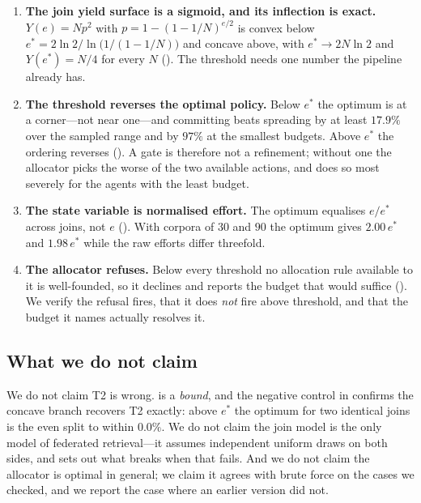 \documentclass[11pt,twocolumn,a4paper]{article}
\theoremstyle{thmstyle}
\theoremstyle{definition}
\theoremstyle{remark}
\newcommand{\eff}{e}
\newcommand{\estar}{e^{*}}
\newcommand{\yield}{Y}
\begin{document}
\begin{enumerate}[leftmargin=1.4em,itemsep=3pt]
\item \textbf{The join yield surface is a sigmoid, and its inflection is
exact.} $\yield(\eff)=Np^{2}$ with $p=1-(1-1/N)^{\eff/2}$ is convex below
$\estar=2\ln2/\ln\!\big(1/(1-1/N)\big)$ and concave above, with
$\estar\to 2N\ln2$ and $\yield(\estar)=N/4$ for every $N$
(). The threshold needs one number the pipeline
already has.

\item \textbf{The threshold reverses the optimal policy.} Below $\estar$
the optimum is at a corner---not near one---and committing beats
spreading by at least $17.9\%$ over the sampled range and by $97\%$ at
the smallest budgets. Above $\estar$ the ordering reverses
(). A gate is therefore not a refinement; without one
the allocator picks the worse of the two available actions, and does so
most severely for the agents with the least budget.

\item \textbf{The state variable is normalised effort.} The optimum
equalises $\eff/\estar$ across joins, not $\eff$
(). With corpora of $30$ and $90$ the optimum gives
$2.00\,\estar$ and $1.98\,\estar$ while the raw efforts differ
threefold.

\item \textbf{The allocator refuses.} Below every threshold no
allocation rule available to it is well-founded, so it declines and
reports the budget that would suffice
(). We verify the
refusal fires, that it does \emph{not} fire above threshold, and that the
budget it names actually resolves it.
\end{enumerate}

\subsection{What we do not claim}
\label{sec:notclaim}

We do not claim T2 is wrong.  is a \emph{bound}, and
the negative control in  confirms the concave branch
recovers T2 exactly: above $\estar$ the optimum for two identical joins
is the even split to within $0.0\%$. We do not claim the join model is
the only model of federated retrieval---it assumes independent uniform
draws on both sides, and  sets out what breaks when that
fails. And we do not claim the allocator is optimal in general; we claim
it agrees with brute force on the cases we checked, and we report the
case where an earlier version did not.
\end{document}
